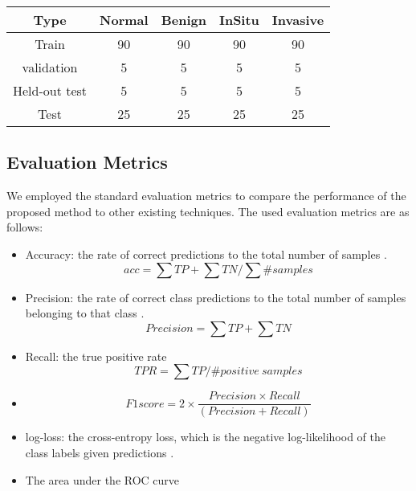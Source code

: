 \documentclass[a4paper, 12 pt, conference]{ieeeconf}
\begin{document}
\begin{minipage}[htbp]{\linewidth}
{} \label{tab:dataset}
\begin{tabular}{|c|c|c|c|c|} \toprule[0.5pt]
\hline
\small Type & \small Normal & \small Benign & \small InSitu & \small Invasive \\
\hline
\small Train & 90 & 90 & 90 & 90 \\
\hline
\small validation & 5 & 5 & 5 & 5 \\
\hline
\small Held-out test & 5 & 5 & 5 & 5 \\
\hline
\small Test & 25 & 25 & 25 & 25 \\
\hline
\bottomrule[.50pt]
\end{tabular}
\end{minipage}

\subsection{Evaluation Metrics}
\quad We employed the standard evaluation metrics to compare the performance of the proposed method to other existing techniques. The used evaluation metrics are as follows:
\begin{itemize}
  \item Accuracy:  the rate of correct predictions to the total number of samples \cite{Williams2006}.
\begin{equation}
  acc = \sum TP + \sum TN/\sum \#samples
\end{equation}
  \item Precision: the rate of correct class predictions to the total number of samples belonging to that class \cite{Williams2006}.
\begin{equation}
 Precision = \sum TP + \sum TN
\end{equation}

 \item Recall: the true positive rate \cite{Williams2006}
\begin{equation}
 TPR = \sum TP /  \#positive \  samples
\end{equation}

 \item
 \begin{equation}
 F1 score = 2 \times \frac{Precision \times Recall}{(Precision + Recall)}
 \end{equation}
 \item log-loss: the cross-entropy loss, which is the negative log-likelihood of the class labels given predictions \cite{Williams2006}.
 \item The area under the ROC curve
\end{itemize}
\end{document}
